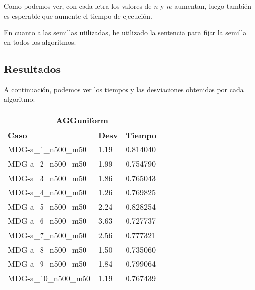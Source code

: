 \documentclass[10pt,a4paper]{article}
\begin{document}
Como podemos ver, con cada letra los valores de $n$ y $m$ aumentan, luego también es esperable que aumente el tiempo de ejecución.

En cuanto a las semillas utilizadas, he utilizado la sentencia  para fijar la semilla en todos los algoritmos.




\subsection{Resultados}

A continuación, podemos ver los tiempos y las desviaciones obtenidas por cada algoritmo:


\begin{table}[]
	\centering
	\begin{tabular}{|l|l|l|}
		\hline
		\multicolumn{3}{|c|}{\textbf{AGGuniform}}                                                          \\ \hline
		\textbf{Caso}          & \multicolumn{1}{c|}{\textbf{Desv}} & \multicolumn{1}{c|}{\textbf{Tiempo}} \\ \hline
		MDG-a\_1\_n500\_m50    & 1.19                               & 0.814040                             \\ \hline
		MDG-a\_2\_n500\_m50    & 1.99                               & 0.754790                             \\ \hline
		MDG-a\_3\_n500\_m50    & 1.86                               & 0.765043                             \\ \hline
		MDG-a\_4\_n500\_m50    & 1.26                               & 0.769825                             \\ \hline
		MDG-a\_5\_n500\_m50    & 2.24                               & 0.828254                             \\ \hline
		MDG-a\_6\_n500\_m50    & 3.63                               & 0.727737                             \\ \hline
		MDG-a\_7\_n500\_m50    & 2.56                               & 0.777321                             \\ \hline
		MDG-a\_8\_n500\_m50    & 1.50                               & 0.735060                             \\ \hline
		MDG-a\_9\_n500\_m50    & 1.84                               & 0.799064                             \\ \hline
		MDG-a\_10\_n500\_m50   & 1.19                               & 0.767439                             \\ \hline

\end{tabular}
\end{table}
\end{document}
